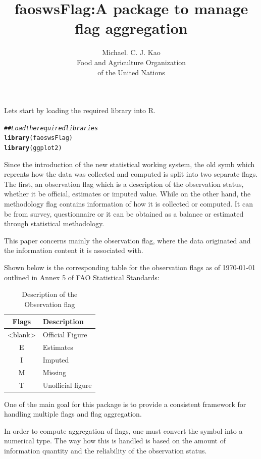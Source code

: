 \documentclass[nojss]{jss}\usepackage[]{graphicx}\usepackage[]{color}
\title{\bf faoswsFlag:A package to manage flag aggregation}
\author{Michael. C. J. Kao\\ Food and Agriculture Organization \\ of
  the United Nations}
\makeatletter
\newcommand{\hlcom}[1]{\textcolor[rgb]{0.678,0.584,0.686}{\textit{#1}}}%
\newcommand{\hlstd}[1]{\textcolor[rgb]{0.345,0.345,0.345}{#1}}%
\newcommand{\hlkwd}[1]{\textcolor[rgb]{0.737,0.353,0.396}{\textbf{#1}}}%
\newenvironment{kframe}{%
 \def\at@end@of@kframe{}%
 \ifinner\ifhmode%
  \def\at@end@of@kframe{\end{minipage}}%
  \begin{minipage}{\columnwidth}%
 \fi\fi%
 \def\FrameCommand##1{\hskip\@totalleftmargin \hskip-\fboxsep
 \colorbox{shadecolor}{##1}\hskip-\fboxsep
     \hskip-\linewidth \hskip-\@totalleftmargin \hskip\columnwidth}%
 \MakeFramed {\advance\hsize-\width
   \@totalleftmargin\z@ \linewidth\hsize
   \@setminipage}}%
 {\par\unskip\endMakeFramed%
 \at@end@of@kframe}
\newenvironment{knitrout}{}{} %
\makeatother
\begin{document}
Lets start by loading the required library into R.

\begin{knitrout}
\color{fgcolor}\begin{kframe}
\begin{alltt}
\hlcom{## Load the required libraries}
\hlkwd{library}\hlstd{(faoswsFlag)}
\hlkwd{library}\hlstd{(ggplot2)}
\end{alltt}
\end{kframe}
\end{knitrout}

Since the introduction of the new statistical working system, the old
symb which reprents how the data was collected and computed is split
into two separate flags. The first, an observation flag which is a
description of the observation status, whether it be official,
estimates or imputed value. While on the other hand, the methodology
flag contains information of how it is collected or computed. It can
be from survey, questionnaire or it can be obtained as a balance or
estimated through statistical methodology.

This paper concerns mainly the observation flag, where the data
originated and the information content it is associated with.

Shown below is the corresponding table for the observation flags as of
\today{} outlined in Annex 5 of FAO Statistical Standards:

\begin{table}[h!]
  \begin{center}
    \caption{Description of the Observation flag}
    \begin{tabular}{|c|p{12cm}|}
      \hline
      Flags & Description\\
      \hline
      <blank> & Official Figure\\
      E & Estimates\\
      I & Imputed\\
      M & Missing\\
      T & Unofficial figure\\
      \hline
    \end{tabular}
  \end{center}  
\end{table}

One of the main goal for this package is to provide a consistent
framework for handling multiple flags and flag aggregation.

In order to compute aggregation of flags, one must convert the symbol
into a numerical type. The way how this is handled is based on the
amount of information quantity and the reliability of the observation
status.
\end{document}
